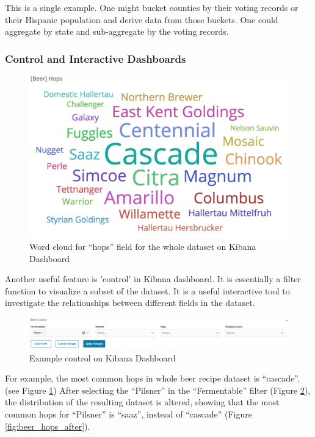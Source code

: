 \documentclass[bibliography=totoc]{article}
\begin{document}
This is a single example. One might bucket counties by their voting records or their Hispanic population and
derive data from those buckets. One could aggregate by state and sub-aggregate by the voting records. 

\subsubsection{Control and Interactive Dashboards}
\begin{figure}[!hb]
  \centering
  \includegraphics[width=\linewidth]{beer_hops.png}
 \caption{Word cloud for ``hops'' field for the whole dataset on Kibana Dashboard}
  \label{fig:beer_hops}
\end{figure}

Another useful feature is 'control' in Kibana dashboard. It is essentially a filter function to visualize a subset of the dataset. It is a useful interactive tool to investigate the relationships between different fields in the dataset.

\begin{figure}
  \centering
  \includegraphics[width=\linewidth]{beer_control.png}
 \caption{Example control on Kibana Dashboard}
  \label{fig:beer_control}
\end{figure}

For example, the most common hops in whole beer recipe dataset is ``cascade''. (see Figure \ref{fig:beer_hops}) After selecting the ``Pilsner'' in the ``Fermentable'' filter (Figure \ref{fig:beer_control}), the distribution of the resulting dataset is altered, showing that the most common hops for ``Pilsner'' is ``saaz'', instead of ``cascade'' (Figure \ref{fig:beer_hops_after}). 
\end{document}

